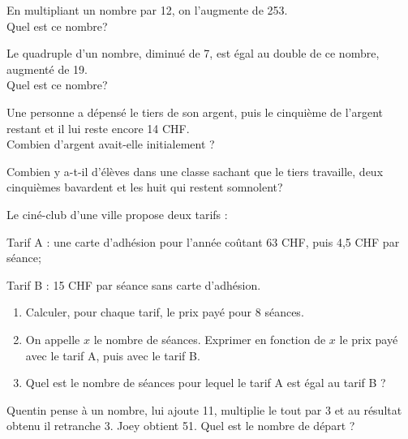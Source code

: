\begin{exercice}
En multipliant un nombre par 12, on l’augmente de 253.\\
Quel est ce nombre?
\end{exercice}

\begin{exercice}
Le quadruple d’un nombre, diminué de 7, est égal au double de ce nombre, augmenté de 19.\\
Quel est ce nombre?
\end{exercice}


\begin{exercice}
Une personne a dépensé le tiers de son argent, puis le cinquième de l’argent restant et il lui reste encore 14 CHF.\\
Combien d’argent avait-elle initialement ?
\end{exercice}

\begin{exercice}
Combien y a-t-il d'élèves dans une classe sachant que le tiers travaille, deux cinquièmes bavardent et les huit qui restent somnolent?
\end{exercice}


\begin{exercice}
Le ciné-club d'une ville propose deux tarifs :
\begin{description}
\item Tarif A : une carte d'adhésion pour l'année coûtant 63 CHF, puis 4,5 CHF par séance;
\item Tarif B : 15 CHF par séance sans carte d'adhésion.
\end{description}

\begin{enumerate}
\item Calculer, pour chaque tarif, le prix payé pour 8 séances.
\item On appelle $x$ le nombre de séances. Exprimer en fonction de $x$ le prix payé avec le tarif A, puis avec le tarif B.
\item Quel est le nombre de séances pour lequel le tarif A est égal au tarif B ?
\end{enumerate}
\end{exercice}

\begin{exercice}
Quentin pense à un nombre, lui ajoute 11, multiplie le tout par 3 et au résultat obtenu il retranche 3. Joey obtient 51. Quel est le nombre de départ ?
\end{exercice}

